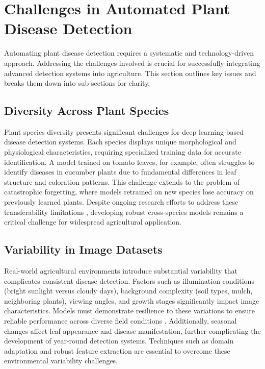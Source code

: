 \documentclass[sn-mathphys]{sn-jnl}
\theoremstyle{thmstyleone}%
\theoremstyle{thmstyletwo}%
\theoremstyle{thmstylethree}%
\begin{document}
\section{Challenges in Automated Plant Disease Detection} \label{sec:challenges}

Automating plant disease detection requires a systematic and technology-driven approach. Addressing the challenges involved is crucial for successfully integrating advanced detection systems into agriculture. This section outlines key issues and breaks them down into sub-sections for clarity.

\subsection{Diversity Across Plant Species} 
Plant species diversity presents significant challenges for deep learning-based disease detection systems. Each species displays unique morphological and physiological characteristics, requiring specialized training data for accurate identification. A model trained on tomato leaves, for example, often struggles to identify diseases in cucumber plants due to fundamental differences in leaf structure and coloration patterns. This challenge extends to the problem of catastrophic forgetting, where models retrained on new species lose accuracy on previously learned plants. Despite ongoing research efforts to address these transferability limitations \citep{guth2023lab, ahmad2023toward}, developing robust cross-species models remains a critical challenge for widespread agricultural application.

\subsection{Variability in Image Datasets} 
Real-world agricultural environments introduce substantial variability that complicates consistent disease detection. Factors such as illumination conditions (bright sunlight versus cloudy days), background complexity (soil types, mulch, neighboring plants), viewing angles, and growth stages significantly impact image characteristics. Models must demonstrate resilience to these variations to ensure reliable performance across diverse field conditions \citep{arsenovic2019solving}. Additionally, seasonal changes affect leaf appearance and disease manifestation, further complicating the development of year-round detection systems. Techniques such as domain adaptation and robust feature extraction are essential to overcome these environmental variability challenges.
\end{document}
